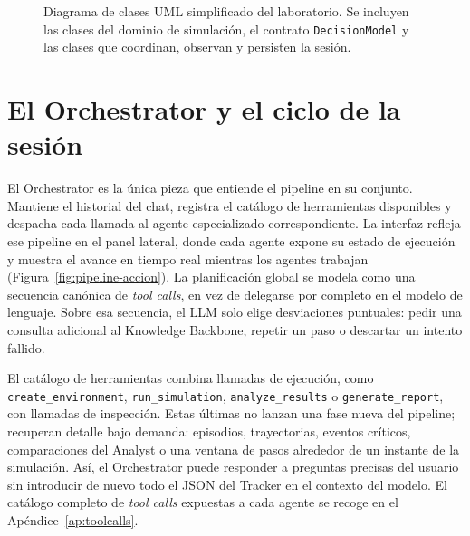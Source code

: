 \begin{figure}[H]
{}
\caption[Diagrama de clases UML]{Diagrama de clases UML simplificado del
laboratorio. Se incluyen las clases del dominio de simulación, el contrato
\texttt{DecisionModel} y las clases que coordinan, observan y persisten la
sesión.}
\label{fig:clases-uml}
\end{figure}

\section{El Orchestrator y el ciclo de la sesión}

El Orchestrator es la única pieza que entiende el pipeline en su
conjunto. Mantiene el historial del chat, registra el catálogo de
herramientas disponibles y despacha cada llamada al agente especializado
correspondiente. La interfaz refleja ese pipeline en el panel lateral, donde
cada agente expone su estado de ejecución y muestra el avance en tiempo real
mientras los agentes trabajan (Figura~\ref{fig:pipeline-accion}). La
planificación global se modela como una secuencia canónica de \textit{tool
calls}, en vez de delegarse por completo en el modelo de lenguaje. Sobre esa
secuencia, el LLM solo elige desviaciones puntuales:
pedir una consulta adicional al Knowledge
Backbone, repetir un paso o descartar un intento fallido.

El catálogo de herramientas combina llamadas de ejecución, como
\texttt{create\_\allowbreak environment}, \texttt{run\_\allowbreak simulation},
\texttt{analyze\_\allowbreak results} o \texttt{generate\_\allowbreak report},
con llamadas de inspección. Estas últimas no lanzan una fase nueva del
pipeline; recuperan detalle bajo demanda: episodios, trayectorias, eventos
críticos, comparaciones del Analyst o una ventana de pasos alrededor de un
instante de la simulación. Así, el Orchestrator puede responder a preguntas precisas del
usuario sin introducir de nuevo todo el JSON del Tracker en el contexto del
modelo. El catálogo completo de \textit{tool calls} expuestas a cada agente se
recoge en el Apéndice~\ref{ap:toolcalls}.

